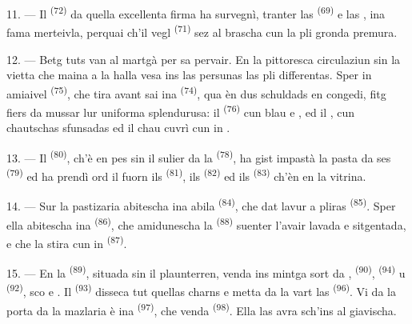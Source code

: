 11. --- Il  \textsuperscript{(72)} da quella excellenta firma ha survegnì,
tranter las  \textsuperscript{(69)} e las , ina fama
merteivla, perquai ch'il vegl  \textsuperscript{(71)} sez al brascha cun la pli
gronda premura.

\VUsaut{4.0mm}
\VUsaut{3.0mm}

12. --- Betg tuts van al martgà per sa pervair. En la pittoresca circulaziun sin la
vietta che maina a la halla vesa ins las persunas las pli differentas. Sper in
amiaivel  \textsuperscript{(75)}, che tira avant sai ina
 \textsuperscript{(74)}, qua èn dus schuldads en congedi, fitg fiers da
mussar lur uniforma splendurusa: il  \textsuperscript{(76)} cun blau
 e , ed il , cun
chautschas sfunsadas ed il chau cuvrì cun in .

13. --- Il  \textsuperscript{(80)}, ch'è en pes sin il sulier da la
 \textsuperscript{(78)}, ha gist impastà la pasta da ses 
\textsuperscript{(79)} ed ha prendì ord il fuorn ils  \textsuperscript{(81)}, ils
 \textsuperscript{(82)} ed ils  \textsuperscript{(83)} ch'èn
en la
vitrina.

14. --- Sur la pastizaria abitescha ina abila  \textsuperscript{(84)}, che
dat lavur a pliras  \textsuperscript{(85)}. Sper ella abitescha ina
 \textsuperscript{(86)}, che amidunescha la 
\textsuperscript{(88)} suenter l'avair lavada e sitgentada, e che la stira cun in
 \textsuperscript{(87)}.

\VUsaut{4.0mm}
\VUsaut{3.0mm}

15. --- En la  \textsuperscript{(89)}, situada sin il plaunterren, venda ins
mintga sort da ,  \textsuperscript{(90)},  \textsuperscript{(94)} u  \textsuperscript{(92)}, sco  e . Il 
\textsuperscript{(93)} disseca tut quellas charns e metta da la vart las  \textsuperscript{(96)}. Vi da la porta da la mazlaria è ina 
\textsuperscript{(97)}, che venda  \textsuperscript{(98)}. Ella las avra sch'ins
al giavischa.

